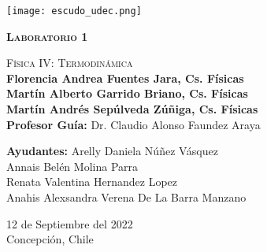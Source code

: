 \documentclass[main.tex]{subfiles}
\begin{document}
 

\begin{titlepage}
  \thispagestyle{frontpage}
 \begin{center}
     \texttt{[image: escudo\_udec.png]}
     
     \vspace*{3\baselineskip}
  \textsc{\Huge \textbf{Laboratorio 1}}
  
     \vspace*{1.5\baselineskip}
  \textsc{\Huge Física IV: Termodinámica}\\

     \vspace*{4\baselineskip}
  \Large{\textbf{Florencia Andrea Fuentes Jara, Cs. Físicas\\ Martín Alberto Garrido Briano, Cs. Físicas \\ Martín Andrés Sepúlveda Zúñiga, Cs. Físicas}}\\ 
    \vspace{2\baselineskip}
 \Large{\textbf{Profesor Guía:} Dr. Claudio Alonso Faundez Araya}\\
     \vspace{1\baselineskip}
     \begin{center}
     \Large{\textbf{Ayudantes:} 
    Arelly Daniela Núñez Vásquez  \\ Annais Belén Molina Parra \\  Renata Valentina Hernandez Lopez \\ Anahis Alexsandra Verena De La Barra Manzano}
    \vspace{2\baselineskip} 
     \end{center}
 
    
         12 de Septiembre del 2022 \\
            Concepción, Chile 
\end{center}
  
  \vspace*{4\baselineskip}
  
\end{titlepage}
   
\end{document}
